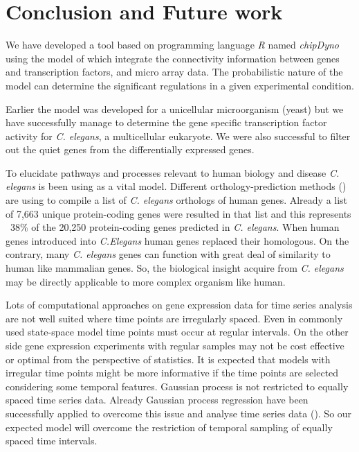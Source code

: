 
\chapter{Conclusion and Future work}

\ifpdf
    \graphicspath{{Chapter6/Figs/Raster/}{Chapter6/Figs/PDF/}{Chapter6/Figs/}}
\else
    \graphicspath{{Chapter6/Figs/Vector/}{Chapter6/Figs/}}
\fi


We have developed a tool based on programming language \emph{R} named \emph{chipDyno} using the model of
\cite{Sanguinetti:2006} which integrate the connectivity information between genes and transcription
factors, and micro array data. The probabilistic nature of the model can determine the significant
regulations in a given experimental condition.

Earlier the model was developed for a unicellular microorganism (yeast) but we have successfully
manage to determine the gene specific transcription factor activity for \textit{C. elegans}, a
multicellular eukaryote. We were also successful to filter out the quiet genes from the
differentially expressed genes.

To elucidate pathways and processes relevant to human biology 
and disease \textit{C. elegans} is been using as a vital model. 
Different orthology-prediction methods (\cite{Daniel:2011}) are using 
to compile a list of \textit{C. elegans} orthologs of human genes. Already 
a  list of 7,663 unique protein-coding genes were resulted in that list and this
represents ~38\% of the 20,250 protein-coding genes predicted in \textit{C. elegans}. 
When human genes introduced into \textit{C.Elegans} human genes replaced their homologous. 
On the contrary, many \textit{C. elegans}
genes can function with great deal of similarity to human like mammalian genes. So, 
the biological insight acquire from \textit{C. elegans} may be directly applicable to more 
complex organism like human.

Lots of computational approaches on gene expression data for time series analysis are not
well suited where time points are irregularly spaced. Even in commonly used state-space
model time points must occur at regular intervals. On the other side gene expression
experiments with regular samples may not be cost effective or optimal from the perspective of
statistics. It is expected that models with irregular time points might be more informative if 
the time points are selected considering some temporal features. Gaussian process is not 
restricted to equally spaced time series data. Already Gaussian process regression have been 
successfully applied to overcome this issue and analyse time series data (\cite{Kalaitzis:2011}).
So our expected model will overcome the restriction of temporal sampling of equally spaced
time intervals. 

